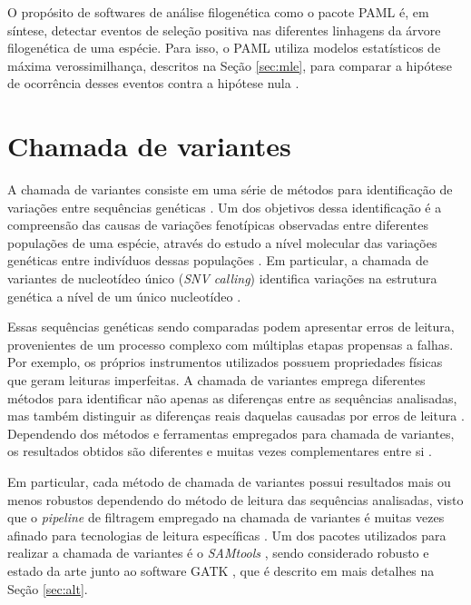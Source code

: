 \documentclass[cic,tc]{iiufrgs}
\begin{document}
O propósito de softwares de análise filogenética como o pacote PAML é, em
síntese, detectar eventos de seleção positiva nas diferentes linhagens da
árvore filogenética de uma espécie. Para isso, o PAML utiliza modelos
estatísticos de máxima verossimilhança, descritos na Seção \ref{sec:mle}, para
comparar a hipótese de ocorrência desses eventos contra a hipótese nula
\cite{moretti2012gcodeml}.

\section{Chamada de variantes}
\label{sec:call}

A chamada de variantes consiste em uma série de métodos para identificação de
variações entre sequências genéticas \cite{nielsen2011genotype}. Um dos
objetivos dessa identificação é a compreensão das causas de variações
fenotípicas observadas entre diferentes populações de uma espécie, através do
estudo a nível molecular das variações genéticas entre indivíduos dessas
populações \cite{jiang2019population}. Em particular, a chamada de variantes de
nucleotídeo único (\textit{SNV calling}) identifica variações na estrutura
genética a nível de um único nucleotídeo \cite{khurana2016role}.

Essas sequências genéticas sendo comparadas podem apresentar erros de leitura,
provenientes de um processo complexo com múltiplas etapas propensas a falhas.
Por exemplo, os próprios instrumentos utilizados possuem propriedades físicas
que geram leituras imperfeitas. A chamada de variantes emprega diferentes
métodos para identificar não apenas as diferenças entre as sequências
analisadas, mas também distinguir as diferenças reais daquelas causadas por
erros de leitura \cite{poplin2018universal}. Dependendo dos métodos e
ferramentas empregados para chamada de variantes, os resultados obtidos são
diferentes e muitas vezes complementares entre
si \cite{hwang2015systematic} \cite{gezsi2015variantmetacaller} \cite{guo2015seqmule}.

Em particular, cada método de chamada de variantes possui resultados mais ou
menos robustos dependendo do método de leitura das sequências analisadas, visto
que o \textit{pipeline} de filtragem empregado na chamada de variantes é muitas vezes
afinado para tecnologias de leitura específicas \cite{poplin2018universal}. Um
dos pacotes utilizados para realizar a chamada de variantes é o
\textit{SAMtools} \cite{pirooznia2014validation}, sendo considerado robusto e estado da
arte junto ao software
GATK \cite{crysnanto2019accurate} \cite{hwang2015systematic}
\cite{yao2020evaluation} \cite{poplin2018universal}, que é descrito em mais
detalhes na Seção \ref{sec:alt}.
\end{document}
